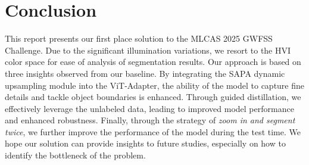 \section{Conclusion}
This report presents our first place solution to the MLCAS 2025 GWFSS Challenge. Due to the significant illumination variations, we resort to the HVI color space for ease of analysis of segmentation results. 
Our approach is based on three insights observed from our baseline. By integrating the SAPA dynamic upsampling module into the ViT-Adapter, the ability of the model to capture fine details and tackle object boundaries is enhanced. Through guided distillation, we effectively leverage the unlabeled data, leading to improved model performance and enhanced robustness. Finally, through the strategy of \textit{zoom in and segment twice}, we further improve the performance of the model during the test time. %
We hope our solution can provide insights to future studies, especially on how to identify the bottleneck of the problem.
